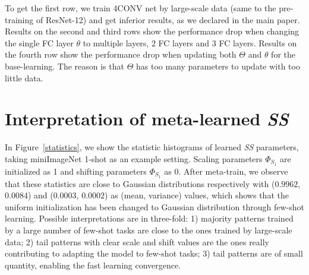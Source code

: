To get the first row, we train 4CONV net by large-scale data (same to the pre-training of ResNet-12) and get inferior results, as we declared in the main paper.
%
Results on the second and third rows show the performance drop when changing the single FC layer $\theta$ to multiple layers, \eg $2$ FC layers and $3$ FC layers. 
Results on the fourth row show the performance drop when updating both $\Theta$ and $\theta$ for the base-learning. The reason is that $\Theta$ has too many parameters to update with too little data.






\section{Interpretation of meta-learned \emph{SS}}
\label{sec_visual}

In Figure~\ref{statistics}, we show the statistic histograms of learned \emph{SS} parameters, taking miniImageNet 1-shot as an example setting.
%
Scaling parameters $\Phi_{S_1}$ are initialized as 1 and shifting parameters $\Phi_{S_1}$ as 0. After meta-train, we observe that these statistics are close to Gaussian distributions respectively with ($0.9962$, $0.0084$) and ($0.0003$, $0.0002$) as (mean, variance) values, which shows that the uniform initialization has been changed to Gaussian distribution through few-shot learning. 
Possible interpretations are in three-fold: 1) majority patterns trained by a large number of few-shot tasks are close to the ones trained by large-scale data; 2) tail patterns with clear scale and shift values are the ones really contributing to adapting the model to few-shot tasks; 3) tail patterns are of small quantity, enabling the fast learning convergence. 


